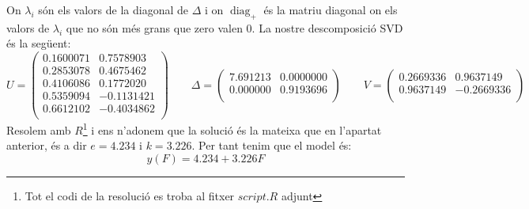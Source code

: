 \documentclass[a4paper]{article}
\DeclareMathOperator{\diag}{diag}
\begin{document}
\begin{enumerate}
	 On $\lambda_i$ són els valors de la diagonal de $\Delta$ i on $\diag_+$ és la matriu diagonal on els valors de $\lambda_i$ que no són més grans que zero valen 0. La nostre descomposició SVD és la següent:
	 $$
	 U =
	 \begin{pmatrix}
		 0.1600071 & 0.7578903 \\
		 0.2853078 & 0.4675462 \\
		 0.4106086 & 0.1772020 \\
		 0.5359094 &-0.1131421 \\
		 0.6612102 &-0.4034862 \\
	 \end{pmatrix}
	 \qquad
	 \Delta =
	 \begin{pmatrix} 
		 7.691213 & 0.0000000 \\
		 0.000000 & 0.9193696 \\
	 \end{pmatrix}
	 \qquad
	  V =
	 \begin{pmatrix}
	 0.2669336 & 0.9637149 \\
	 0.9637149 & -0.2669336 \\
	 \end{pmatrix}
	 \qquad
	 $$
	 Resolem amb $R$\footnote{Tot el codi de la resolució es troba al fitxer $script.R$ adjunt } i ens n'adonem que la solució és la mateixa que en l'apartat anterior, és a dir $e = 4.234$ i $k = 3.226$. Per tant tenim que el model és:
	 $$
	 y(F) = 4.234 + 3.226 F
	 $$

	 
	
\end{enumerate}
\end{document}
